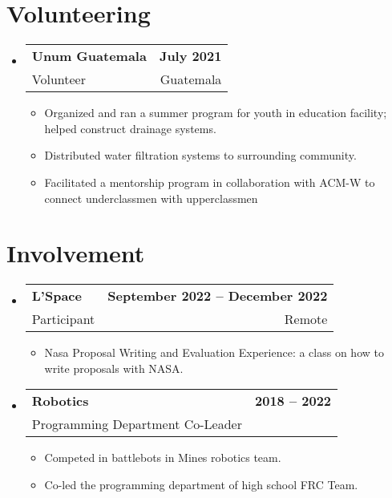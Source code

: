 \documentclass[11pt, letterpaper]{article}
\makeatletter
\newcommand{\resumeItem}[1]{
  \item\small{
    {#1 \vspace{-2pt}}
  }
}
\newcommand{\resumeSubheading}[4]{
  \vspace{-2pt}\item
    \begin{tabular*}{1.0\textwidth}[t]{l@{\extracolsep{\fill}}r}
      \textbf{#1} & \textbf{\small #2} \\
      {\small#3} & {\small #4} \\
    \end{tabular*}\vspace{-7pt}
}
\newcommand{\resumeSubHeadingListStart}{\begin{itemize}[leftmargin=0.0in, label={}]}
\newcommand{\resumeSubHeadingListEnd}{\end{itemize}}
\newcommand{\resumeItemListStart}{\begin{itemize}}
\newcommand{\resumeItemListEnd}{\end{itemize}\vspace{-5pt}}
\makeatother
\begin{document}
\section{Volunteering}
  \resumeSubHeadingListStart
  
    \resumeSubheading
      {Unum Guatemala}{July 2021}
      {Volunteer}{Guatemala}
      \resumeItemListStart
        \resumeItem{Organized and ran a summer program for youth in education facility; helped construct drainage systems.}
        \resumeItem{Distributed water filtration systems to surrounding community.}
        \resumeItem{Facilitated a mentorship program in collaboration with ACM-W to connect underclassmen with upperclassmen}
      \resumeItemListEnd
      
  \resumeSubHeadingListEnd

\section{Involvement}
  \resumeSubHeadingListStart
  
    \resumeSubheading
      {L'Space}{September 2022 -- December 2022}
      {Participant}{Remote}
      \resumeItemListStart
        \resumeItem{Nasa Proposal Writing and Evaluation Experience: a class on how to write proposals with NASA.}
      \resumeItemListEnd
      
    \resumeSubheading
        {Robotics}{2018 -- 2022}{Programming Department Co-Leader}{}
        \resumeItemListStart
        \resumeItem{Competed in battlebots in Mines robotics team.}
        \resumeItem{Co-led the programming department of high school FRC Team.}
        \resumeItemListEnd

  \resumeSubHeadingListEnd

      
\end{document}
